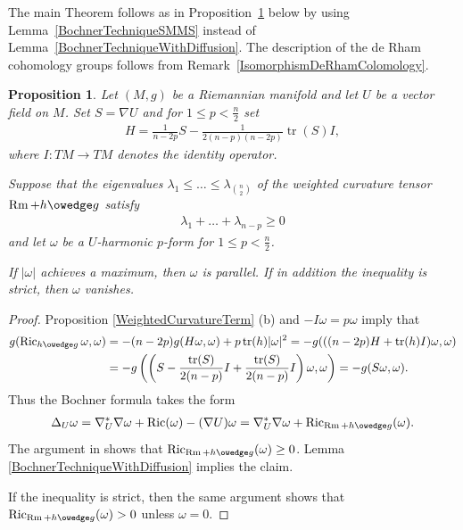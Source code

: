\documentclass[pdftex]{sigma}
\numberwithin{equation}{section}
\newtheorem{Proposition}[Theorem]{Proposition}
{ \theoremstyle{definition}
\newtheorem{Remark}[Theorem]{Remark} }
\newcommand{\Ric} {\operatorname{Ric}}
\newcommand{ \tr } {\operatorname{tr}}
\newcommand{\Rm} {\operatorname{Rm}}
\begin{document}
The main Theorem follows as in Proposition~\ref{BochnerWithDiffusionForForms} below by using Lemma~\ref{BochnerTechniqueSMMS} instead of Lemma~\ref{BochnerTechniqueWithDiffusion}. The description of the de Rham cohomology groups follows from Remark~\ref{IsomorphismDeRhamColomology}.

\begin{Proposition}\label{BochnerWithDiffusionForForms}
Let $(M,g)$ be a Riemannian manifold and let $U$ be a vector field on $M$. Set $S= \nabla U$ and for $1 \leq p < \frac{n}{2}$ set
\begin{gather*}
H = \frac{1}{n-2p} S - \frac{1}{2(n-p)(n-2p)} \tr(S) I,
\end{gather*}
where $I \colon TM \to TM$ denotes the identity operator.

Suppose that the eigenvalues $\lambda_1 \leq \dots \leq \lambda_{\genfrac(){0pt}{2}{n}{2}}$ of the weighted curvature tensor $\Rm + h \owedge g$ satisfy
\begin{gather*}
\lambda_1 + \dots + \lambda_{n-p} \geq 0
\end{gather*}
and let $\omega$ be a $U$-harmonic $p$-form for $1 \leq p < \frac{n}{2}$.

If $| \omega |$ achieves a maximum, then $\omega$ is parallel. If in addition the inequality is strict, then $\omega$ vanishes.
\end{Proposition}
\begin{proof}
Proposition \ref{WeightedCurvatureTerm} (b) and $- I \omega = p \omega$ imply that
\begin{align*}
g( \Ric_{h \owedge g} \omega, \omega ) & = - (n-2p) g( H \omega, \omega) + p \tr(h) | \omega|^2
  = - g( ( (n-2p)H+ \tr(h) I ) \omega, \omega ) \\
& = - g \left( \left( S- \frac{\tr(S)}{2(n-p)} I + \frac{\tr(S)}{2(n-p)} I \right) \omega, \omega \right)
  = - g( S \omega, \omega ).
\end{align*}
Thus the Bochner formula takes the form
\begin{gather*}
\Delta_U \omega = \nabla^{*}_U \nabla \omega + \Ric(\omega) - (\nabla U) \omega = \nabla^{*}_U \nabla \omega + \Ric_{\Rm + h \owedge g}(\omega).
\end{gather*}
The argument in \cite[proof of Theorem A]{PetersenWinkBochner} shows that $\Ric_{\Rm+h \owedge g}( \omega ) \geq 0$. Lemma \ref{BochnerTechniqueWithDiffusion} implies the claim.

If the inequality is strict, then the same argument shows that $\Ric_{\Rm+h \owedge g}( \omega ) > 0$ unless $\omega =0$.
\end{proof}
\end{document}
